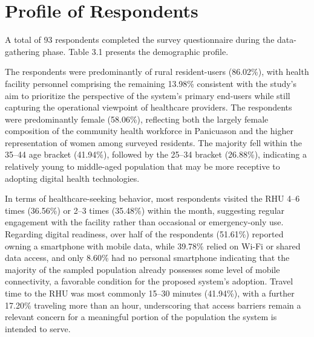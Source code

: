 \documentclass{research}
\begin{document}
\section{Profile of Respondents}
A total of 93 respondents completed the survey questionnaire during the data-gathering phase. Table 3.1 presents the demographic profile. 

The respondents were predominantly of rural resident-users (86.02\%), with health facility personnel comprising the remaining 13.98\% consistent with the study's aim to prioritize the perspective of the system's primary end-users while still capturing the operational viewpoint of healthcare providers. The respondents were predominantly female (58.06\%), reflecting both the largely female composition of the community health workforce in Panicuason and the higher representation of women among surveyed residents. The majority fell within the 35--44 age bracket (41.94\%), followed by the 25--34 bracket (26.88\%), indicating a relatively young to middle-aged population that may be more receptive to adopting digital health technologies.
 
In terms of healthcare-seeking behavior, most respondents visited the RHU 4--6 times (36.56\%) or 2--3 times (35.48\%) within the month, suggesting regular engagement with the facility rather than occasional or emergency-only use. Regarding digital readiness, over half of the respondents (51.61\%) reported owning a smartphone with mobile data, while 39.78\% relied on Wi-Fi or shared data access, and only 8.60\% had no personal smartphone indicating that the majority of the sampled population already possesses some level of mobile connectivity, a favorable condition for the proposed system's adoption. Travel time to the RHU was most commonly 15--30 minutes (41.94\%), with a further 17.20\% traveling more than an hour, underscoring that access barriers remain a relevant concern for a meaningful portion of the population the system is intended to serve.
\end{document}
